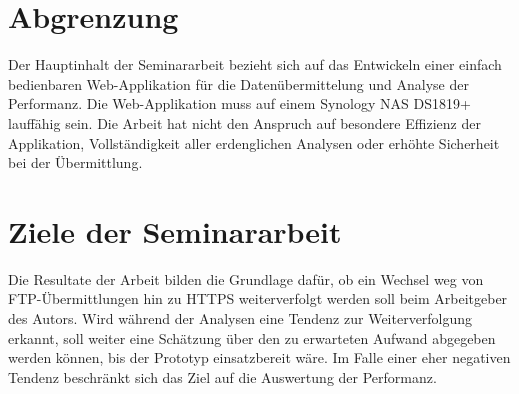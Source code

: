 \section{Abgrenzung}
Der Hauptinhalt der Seminararbeit bezieht sich auf das Entwickeln einer einfach bedienbaren Web-Applikation für die Datenübermittelung und Analyse der Performanz.
Die Web-Applikation muss auf einem Synology NAS DS1819+ lauffähig sein.
Die Arbeit hat nicht den Anspruch auf besondere Effizienz der Applikation, Vollständigkeit aller erdenglichen Analysen oder erhöhte Sicherheit bei der Übermittlung. 

\section{Ziele der Seminararbeit}
Die Resultate der Arbeit bilden die Grundlage dafür, ob ein Wechsel weg von FTP-Übermittlungen hin zu HTTPS weiterverfolgt werden soll beim Arbeitgeber des Autors.
Wird während der Analysen eine Tendenz zur Weiterverfolgung erkannt, soll weiter eine Schätzung über den zu erwarteten Aufwand abgegeben werden können, bis der Prototyp einsatzbereit wäre.
Im Falle einer eher negativen Tendenz beschränkt sich das Ziel auf die Auswertung der Performanz.